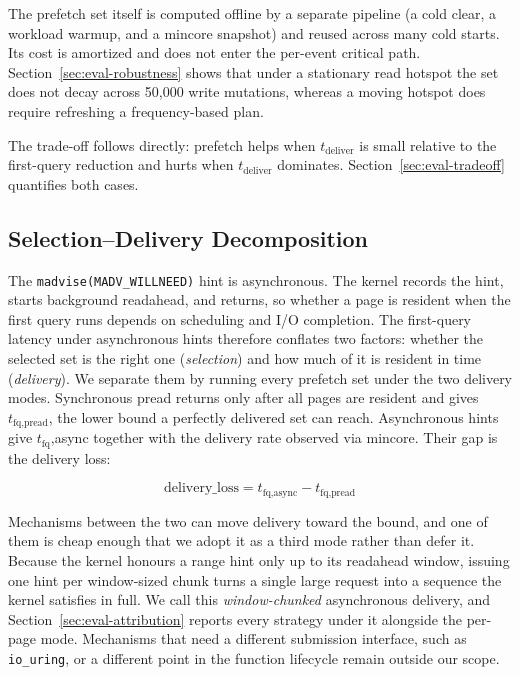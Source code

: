 \documentclass[sigconf, nonacm]{acmart}
\begin{document}
The prefetch set itself is computed offline by a separate pipeline (a cold clear, a workload warmup, and a mincore snapshot) and reused across many cold starts. Its cost is amortized and does not enter the per-event critical path. Section~\ref{sec:eval-robustness} shows that under a stationary read hotspot the set does not decay across 50,000 write mutations, whereas a moving hotspot does require refreshing a frequency-based plan.

The trade-off follows directly: prefetch helps when $t_{\text{deliver}}$ is small relative to the first-query reduction and hurts when $t_{\text{deliver}}$ dominates. Section~\ref{sec:eval-tradeoff} quantifies both cases.

\subsection{Selection--Delivery Decomposition}\label{sec:selection-delivery}

The \texttt{madvise(MADV\_WILLNEED)} hint is asynchronous. The kernel records the hint, starts background readahead, and returns, so whether a page is resident when the first query runs depends on scheduling and I/O completion. The first-query latency under asynchronous hints therefore conflates two factors: whether the selected set is the right one (\textit{selection}) and how much of it is resident in time (\textit{delivery}). We separate them by running every prefetch set under the two delivery modes. Synchronous pread returns only after all pages are resident and gives $t_{\text{fq,pread}}$, the lower bound a perfectly delivered set can reach. Asynchronous hints give $t_{\text{fq}}$,async together with the delivery rate observed via mincore. Their gap is the delivery loss:

\begin{equation}\label{eq:delivery_loss}
    \text{delivery\_loss} = t_{\text{fq,async}} - t_{\text{fq,pread}}
\end{equation}

Mechanisms between the two can move delivery toward the bound, and one of them is cheap
enough that we adopt it as a third mode rather than defer it. Because the kernel honours a
range hint only up to its readahead window, issuing one hint per window-sized chunk turns a
single large request into a sequence the kernel satisfies in full. We call this
\textit{window-chunked} asynchronous delivery, and Section~\ref{sec:eval-attribution}
reports every strategy under it alongside the per-page mode. Mechanisms that need a
different submission interface, such as \texttt{io\_uring}, or a different point in the
function lifecycle remain outside our scope.
\end{document}
